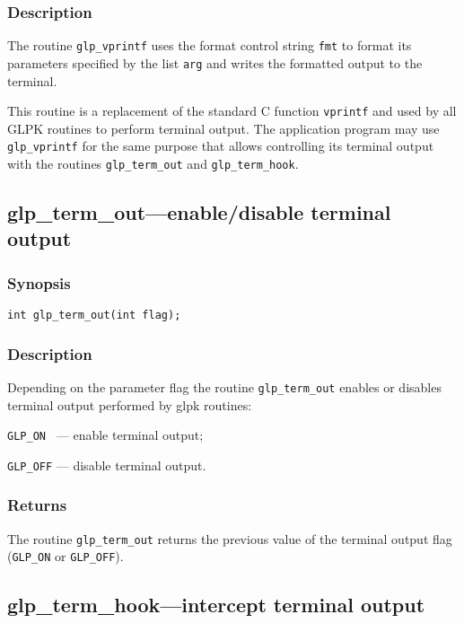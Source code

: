 \subsubsection*{Description}

The routine \verb|glp_vprintf| uses the format control string
\verb|fmt| to format its parameters specified by the list \verb|arg|
and writes the formatted output to the terminal.

This routine is a replacement of the standard C function
\verb|vprintf| and used by all GLPK routines to perform terminal
output. The application program may use \verb|glp_vprintf| for the same
purpose that allows controlling its terminal output with the routines
\verb|glp_term_out| and \verb|glp_term_hook|.

\subsection{glp\_term\_out---enable/disable terminal output}

\subsubsection*{Synopsis}

\begin{verbatim}
int glp_term_out(int flag);
\end{verbatim}

\subsubsection*{Description}

Depending on the parameter flag the routine \verb|glp_term_out| enables
or disables terminal output performed by glpk routines:

\verb|GLP_ON | --- enable terminal output;

\verb|GLP_OFF| --- disable terminal output.

\subsubsection*{Returns}

The routine \verb|glp_term_out| returns the previous value of the
terminal output flag (\verb|GLP_ON| or \verb|GLP_OFF|).

\subsection{glp\_term\_hook---intercept terminal output}

